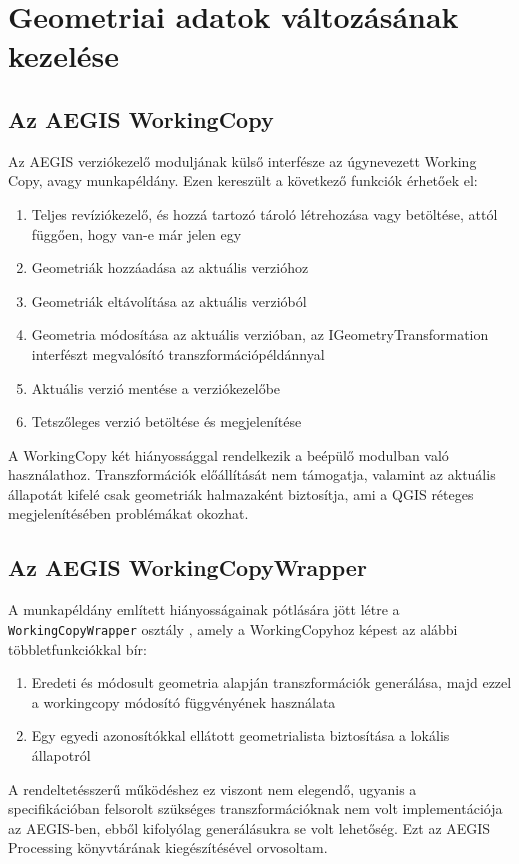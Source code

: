 \section{Geometriai adatok változásának kezelése}
\subsection{Az AEGIS WorkingCopy}
Az AEGIS verziókezelő moduljának külső interfésze az úgynevezett Working Copy, avagy munkapéldány. Ezen kereszült a következő funkciók érhetőek el:
\begin{enumerate}
	\item Teljes revíziókezelő, és hozzá tartozó tároló létrehozása vagy betöltése, attól függően, hogy van-e már jelen egy
	\item Geometriák hozzáadása az aktuális verzióhoz
	\item Geometriák eltávolítása az aktuális verzióból
	\item Geometria módosítása az aktuális verzióban, az IGeometryTransformation interfészt megvalósító transzformációpéldánnyal
	\item Aktuális verzió mentése a verziókezelőbe
	\item Tetszőleges verzió betöltése és megjelenítése
\end{enumerate}
A WorkingCopy két hiányossággal rendelkezik a beépülő modulban való használathoz. Transzformációk előállítását nem támogatja, valamint az aktuális állapotát kifelé csak geometriák halmazaként biztosítja, ami a QGIS réteges megjelenítésében problémákat okozhat.
\subsection{Az AEGIS WorkingCopyWrapper}
A munkapéldány említett hiányosságainak pótlására jött létre a \texttt{WorkingCopyWrapper} osztály , amely a WorkingCopyhoz képest az alábbi többletfunkciókkal bír:
\begin{enumerate}
	\item Eredeti és módosult geometria alapján transzformációk generálása, majd ezzel a workingcopy módosító függvényének használata
	\item Egy egyedi azonosítókkal ellátott geometrialista biztosítása a lokális állapotról
\end{enumerate}
A rendeltetésszerű működéshez ez viszont nem elegendő, ugyanis a specifikációban felsorolt szükséges transzformációknak nem volt implementációja az AEGIS-ben, ebből kifolyólag generálásukra se volt lehetőség. Ezt az AEGIS Processing könyvtárának kiegészítésével orvosoltam. 
